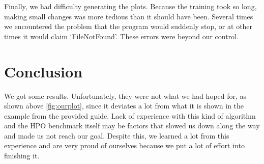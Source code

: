 \documentclass[10pt,a4paper,twocolumn]{article}
\begin{document}
{Finally, we had difficulty generating the plots. Because the training took so long, making small changes was more tedious than it should have been. Several times we encountered the problem that the program would suddenly stop, or at other times it would claim ‘FileNotFound’. These errors were beyond our control.

\section{Conclusion}
We got some results. Unfortunately, they were not what we had hoped for, as shown above \ref{fig:ourplot}, since it deviates a lot from what it is shown in the example from the provided guide. Lack of experience with this kind of algorithm and the HPO benchmark itself may be factors that slowed us down along the way and made us not reach our goal. Despite this, we learned a lot from this experience and are very proud of ourselves because we put a lot of effort into finishing it.

}
\end{document}
